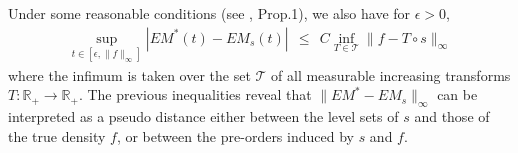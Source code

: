 Under some reasonable conditions (see \cite{AISTAT15}, Prop.1), we also have 
for $\epsilon >0$, 
\begin{align*}
\sup_{t\in[\epsilon ,\|f\|_\infty]}|EM^*(t)-EM_s(t)| ~~\le~~  C \inf_{T  \in \mathcal{T}} \|f-T\circ s\|_\infty
\end{align*}
where the infimum is taken over the set $\mathcal{T}$ of all measurable increasing transforms $T : \mathbb{R}_+ \rightarrow \mathbb{R}_+$.
The previous inequalities reveal that $\|EM^* - EM_s\|_\infty$ can be interpreted as a pseudo distance either between the level sets of $s$ and those of the true density $f$, or between the pre-orders induced by $s$ and $f$. %


